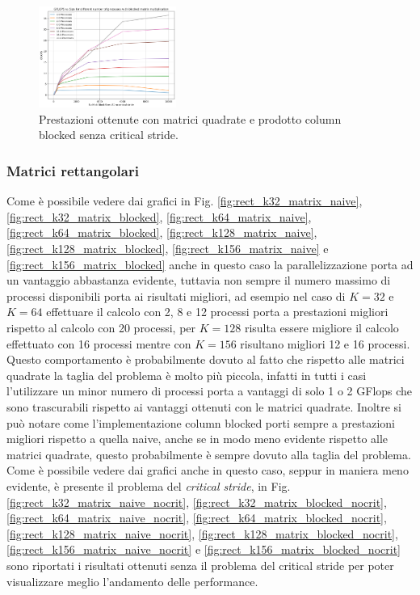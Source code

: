 \documentclass[conference]{IEEEtran}
\begin{document}
\begin{figure}[H]
    \centering
    \includegraphics[width=0.4\textwidth]{resources/square_blocked_nocrit.png}
    \caption{Prestazioni ottenute con matrici quadrate e prodotto column blocked senza critical stride.}
    \label{fig:square_matrix_blocked_nocrit}
\end{figure}
\subsubsection{Matrici rettangolari}
Come è possibile vedere dai grafici in Fig. \ref{fig:rect_k32_matrix_naive}, \ref{fig:rect_k32_matrix_blocked}, \ref{fig:rect_k64_matrix_naive}, \ref{fig:rect_k64_matrix_blocked}, \ref{fig:rect_k128_matrix_naive}, \ref{fig:rect_k128_matrix_blocked}, \ref{fig:rect_k156_matrix_naive} e \ref{fig:rect_k156_matrix_blocked} anche in questo caso la parallelizzazione porta ad un vantaggio abbastanza evidente, tuttavia non sempre il numero massimo di processi disponibili porta ai risultati migliori, ad esempio nel caso di $K=32$ e $K=64$ effettuare il calcolo con 2, 8 e 12 processi porta a prestazioni migliori rispetto al calcolo con 20 processi, per $K=128$ risulta essere migliore il calcolo effettuato con 16 processi mentre con $K=156$ risultano migliori 12 e 16 processi. Questo comportamento è probabilmente dovuto al fatto che rispetto alle matrici quadrate la taglia del problema è molto più piccola, infatti in tutti i casi l'utilizzare un minor numero di processi porta a vantaggi di solo 1 o 2 GFlops che sono trascurabili rispetto ai vantaggi ottenuti con le matrici quadrate. Inoltre si può notare come l'implementazione column blocked porti sempre a prestazioni migliori rispetto a quella naive, anche se in modo meno evidente rispetto alle matrici quadrate, questo probabilmente è sempre dovuto alla taglia del problema.
Come è possibile vedere dai grafici anche in questo caso, seppur in maniera meno evidente, è presente il problema del \textit{critical stride}, in Fig. \ref{fig:rect_k32_matrix_naive_nocrit}, \ref{fig:rect_k32_matrix_blocked_nocrit}, \ref{fig:rect_k64_matrix_naive_nocrit}, \ref{fig:rect_k64_matrix_blocked_nocrit}, \ref{fig:rect_k128_matrix_naive_nocrit}, \ref{fig:rect_k128_matrix_blocked_nocrit}, \ref{fig:rect_k156_matrix_naive_nocrit} e \ref{fig:rect_k156_matrix_blocked_nocrit} sono riportati i risultati ottenuti senza il problema del critical stride per poter visualizzare meglio l'andamento delle performance.
\end{document}
